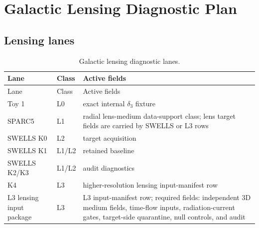 \section{Galactic Lensing Diagnostic Plan}\label{manual:galactic-lensing-diagnostic-plan}

\subsection{Lensing lanes}\label{manual:lensing-status-lock}
\small
\begin{longtable}{p{}p{}p{}}
\caption{Galactic lensing diagnostic lanes.}\label{tab:manual-lensing-status-lock}\\
\toprule
Lane & Class & Active fields\\
\midrule
\endfirsthead
\toprule
Lane & Class & Active fields\\
\midrule
\endhead
Toy 1 & L0 & exact internal \(\delta_3\) fixture\\
SPARC5 & L1 & radial lens-medium data-support class; lens target fields are carried by SWELLS or L3 rows\\
SWELLS K0 & L2 & target acquisition\\
SWELLS K1 & L1/L2 & retained baseline\\
SWELLS K2/K3 & L1/L2 & audit diagnostics\\
K4 & L3 & higher-resolution lensing input-manifest row\\
L3 lensing input package & L3 & L3 input-manifest row; required fields: independent 3D medium fields, time-flow inputs, radiation-current gates, target-side quarantine, null controls, and audit\\
\bottomrule
\end{longtable}
\normalsize

